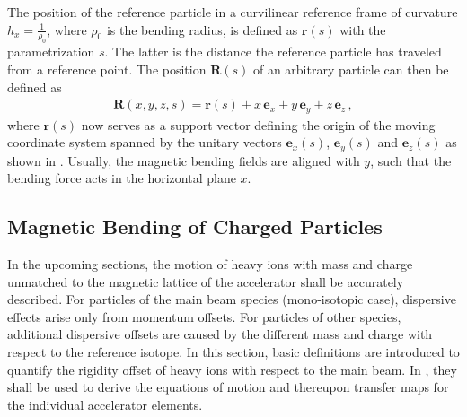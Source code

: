 The position of the reference particle in a curvilinear reference frame of curvature $h_x = \frac{1}{\rho_0}$, where $\rho_0$ is the bending radius, is defined as $\textbf{r}(s)$ with the parametrization $s$. The latter is the distance the reference particle has traveled from a reference point. The position $\textbf{R}(s)$ of an arbitrary particle can then be defined as
%
\begin{align}
\textbf{R}(x,y,z,s) = \textbf{r} (s) + x  \, \textbf{e}_x + y \,  \textbf{e}_y + z \, \textbf{e}_z \, , \label{eq:refframe}
\end{align}
%
where $\textbf{r}(s)$ now serves as a support vector defining the origin of the moving coordinate system spanned by the unitary vectors $\textbf{e}_x (s)$, $\textbf{e}_y (s)$ and $\textbf{e}_z (s)$ as shown in . Usually, the magnetic bending fields are aligned with $y$, such that the bending force acts in the horizontal plane $x$.







\subsection{Magnetic Bending of Charged Particles}\label{transverse:ions}

In the upcoming sections, the motion of heavy ions with mass and charge unmatched to the magnetic lattice of the accelerator shall be accurately described. For particles of the main beam species (mono-isotopic case), dispersive effects arise only from momentum offsets. For particles of other species, additional dispersive offsets are caused by the different mass and charge with respect to the reference isotope. In this section, basic definitions are introduced to quantify the rigidity offset of heavy ions with respect to the main beam. In , they shall be used to derive the equations of motion and thereupon transfer maps for the individual accelerator elements. 


